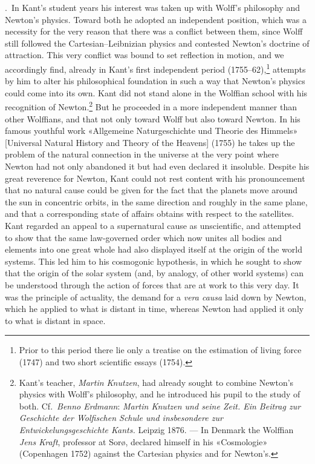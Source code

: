 \documentclass[12pt,a4paper]{article}
\begin{document}
.\ In Kant's student years his interest was taken up with
Wolff's philosophy and Newton's physics. Toward both he adopted an
independent position, which was a necessity for the very reason that there
was a conflict between them, since Wolff still followed the
Cartesian--Leibnizian physics and contested Newton's doctrine of
attraction. This very conflict was bound to set reflection in motion, and
we accordingly find, already in Kant's first independent period
(1755--62),\footnote{Prior to this period there lie only a treatise on
the estimation of living force (1747) and two short scientific essays
(1754).} attempts by him to alter his philosophical foundation in such a
way that Newton's physics could come into its own. Kant did not stand
alone in the Wolffian school with his recognition of
Newton.\footnote{Kant's teacher, \emph{Martin Knutzen}, had already sought to
combine Newton's physics with Wolff's philosophy, and he introduced his
pupil to the study of both. Cf.\ \emph{Benno Erdmann}: \textit{Martin Knutzen
und seine Zeit. Ein Beitrag zur Geschichte der Wolfischen Schule und
insbesondere zur Entwickelungsgeschichte Kants.} Leipzig 1876. --- In
Denmark the Wolffian \emph{Jens Kraft}, professor at Sorø, declared himself in
his «Cosmologie» (Copenhagen 1752) against the Cartesian physics and for
Newton's.} But he proceeded in a more independent manner than other
Wolffians, and that not only toward Wolff but also toward Newton. In his
famous youthful work «Allgemeine Naturgeschichte und Theorie des Himmels»
[Universal Natural History and Theory of the Heavens] (1755) he takes up
the problem of the natural connection in the universe at the very point
where Newton had not only abandoned it but had even declared it
insoluble. Despite his great reverence for Newton, Kant could not rest
content with his pronouncement that no natural cause could be given for
the fact that the planets move around the sun in concentric orbits, in
the same direction and roughly in the same plane, and that a corresponding
state of affairs obtains with respect to the satellites. Kant regarded an
appeal to a supernatural cause as unscientific, and attempted to show that
the same law-governed order which now unites all bodies and elements into
one great whole had also displayed itself at the origin of the world
systems. This led him to his cosmogonic hypothesis, in which he sought to
show that the origin of the solar system (and, by analogy, of other world
systems) can be understood through the action of forces that are at work
to this very day. It was the principle of actuality, the demand for a
\textit{vera causa} laid down by Newton, which he applied to what is
distant in time, whereas Newton had applied it only to what is distant in
space.
\end{document}

